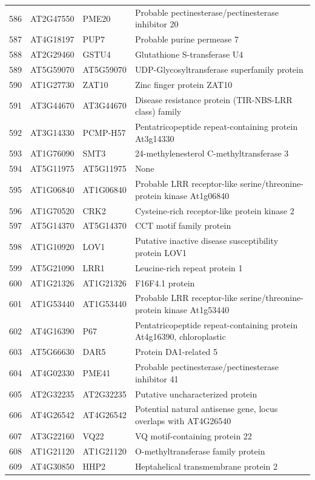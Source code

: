 \documentclass[11pt]{article}
\begin{document}
\begin{center}
\begin{tabular}{rlll}
586 & AT2G47550 & PME20 & Probable pectinesterase/pectinesterase inhibitor 20\\
587 & AT4G18197 & PUP7 & Probable purine permease 7\\
588 & AT2G29460 & GSTU4 & Glutathione S-transferase U4\\
589 & AT5G59070 & AT5G59070 & UDP-Glycosyltransferase superfamily protein\\
590 & AT1G27730 & ZAT10 & Zinc finger protein ZAT10\\
591 & AT3G44670 & AT3G44670 & Disease resistance protein (TIR-NBS-LRR class) family\\
592 & AT3G14330 & PCMP-H57 & Pentatricopeptide repeat-containing protein At3g14330\\
593 & AT1G76090 & SMT3 & 24-methylenesterol C-methyltransferase 3\\
594 & AT5G11975 & AT5G11975 & None\\
595 & AT1G06840 & AT1G06840 & Probable LRR receptor-like serine/threonine-protein kinase At1g06840\\
596 & AT1G70520 & CRK2 & Cysteine-rich receptor-like protein kinase 2\\
597 & AT5G14370 & AT5G14370 & CCT motif family protein\\
598 & AT1G10920 & LOV1 & Putative inactive disease susceptibility protein LOV1\\
599 & AT5G21090 & LRR1 & Leucine-rich repeat protein 1\\
600 & AT1G21326 & AT1G21326 & F16F4.1 protein\\
601 & AT1G53440 & AT1G53440 & Probable LRR receptor-like serine/threonine-protein kinase At1g53440\\
602 & AT4G16390 & P67 & Pentatricopeptide repeat-containing protein At4g16390, chloroplastic\\
603 & AT5G66630 & DAR5 & Protein DA1-related 5\\
604 & AT4G02330 & PME41 & Probable pectinesterase/pectinesterase inhibitor 41\\
605 & AT2G32235 & AT2G32235 & Putative uncharacterized protein\\
606 & AT4G26542 & AT4G26542 & Potential natural antisense gene, locus overlaps with AT4G26540\\
607 & AT3G22160 & VQ22 & VQ motif-containing protein 22\\
608 & AT1G21120 & AT1G21120 & O-methyltransferase family protein\\
609 & AT4G30850 & HHP2 & Heptahelical transmembrane protein 2\\

\end{tabular}
\end{center}
\end{document}
